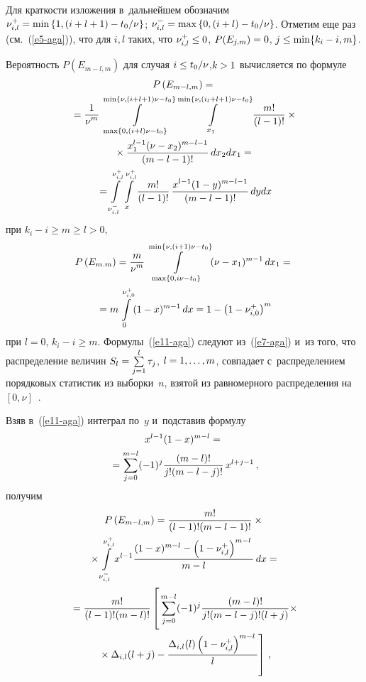 \begin{multicols}{2}
  Для краткости изложения в~дальнейшем обозначим $\nu^+_{i,l}\hm= \min
\left\{ 1, (i+l+1) - t_0/\nu\right\}$; $\nu^-_{i,l}\hm= \max \left\{ 0, (i+l)-
t_0/\nu\right\}$. Отметим еще раз (см.~(\ref{e5-aga})), что для $i,l$ таких, что
$\nu^+_{i,l}\hm\leq 0$, $P(E_{j,m})\hm=0$, $j\hm\leq \min \{k_i\hm-i,m\}$.

  Вероятность $P(E_{m-l,m})$ для случая $i\hm\leq t_0/\nu$,\linebreak $k\hm>1$
вычисляется по формуле
  \begin{multline}
  P\left( E_{m-l,m}\right) ={}\\
  {}= \displaystyle\frac{\displaystyle 1\mathstrut}{\displaystyle \nu^m\mathstrut} \int\limits_{\max\{0,(i+l)\nu-
t_0\}}^{\min\{\nu,(i+l+1)\nu-t_0\}}\int\limits_{x_1}^{\min\{\nu,(i_l+l+1)\nu-t_0\}}
 \displaystyle\frac{\displaystyle m!\mathstrut}{\displaystyle (l-1)!\mathstrut}\times{}\\
 {}\times \displaystyle\frac{\displaystyle x_1^{l-1}(\nu-x_2)^{m-l-1}\mathstrut}{\displaystyle (m-l-
1)!\mathstrut}\,dx_2dx_1={}\\
  {}=
  \int\limits_{\nu_{i,l}^-}^{\nu_{i,l}^+} \int\limits_x^{\nu_{i,l}^+} \displaystyle\frac{\displaystyle m!\mathstrut}{\displaystyle (l-
1)!\mathstrut}\,\displaystyle\frac{\displaystyle x^{l-1}(1-y)^{m-l-1}\mathstrut}{\displaystyle (m-l-1)!\mathstrut}\,dy dx
  \label{e11-aga}
  \end{multline}
при $k_i-i\geq m\geq l>0$,
\begin{multline*}
P\left( E_{m.m}\right) =\displaystyle\frac{\displaystyle m\mathstrut}{\displaystyle \nu^m\mathstrut} \int\limits^{\min\{\nu,(i+1)\nu-
t_0\}}_{\max\{0,i\nu-t_0\}} (\nu-x_1)^{m-1}\,dx_1={}\\
{}=m\int\limits_0^{\nu_{i,0}^+} (1-x)^{m-1}\,dx=1-\left(1-\nu^+_{i,0}\right)^m
\end{multline*}
при $l=0$, $k_i-i\geq m$. Формулы~(\ref{e11-aga}) следуют из~(\ref{e7-aga}) и~из того, что распределение величин $S_l\hm= \sum\limits_{j=1}^l \tau_j$, $l\hm=
1,\ldots ,m$, совпадает с~распределением порядковых статистик из
выборки~$n$, взятой из равномерного распределения на $[0,\nu]$~\cite{7-aga}.

  Взяв в~(\ref{e11-aga}) интеграл по~$y$ и~подставив формулу
  \begin{multline}
  x^{l-1}(1-x)^{m-l} ={}\\
  {}= \sum\limits_{j=0}^{m-l} (-1)^j \displaystyle\frac{\displaystyle (m-l)!\mathstrut}{\displaystyle j!(m-l-
j)!\mathstrut}\,x^{l+j-1}\,,
  \label{e12-aga}
  \end{multline}
получим
\begin{multline}
P\left( E_{m-l,m}\right) = \fr{m!}{(l-1)!(m-l-1)!}\times{}\\
{}\times \int\limits_{\nu^-
_{i,l}}^{\nu^+_{i,l}} x^{l-1}\fr{(1-x)^{m-l}-\left(1-\nu^+_{i,l}\right)^{m-l}}{m-
l}\,dx={}\\
{}=\fr{m!}{(l-1)!(m-l)!} \left[
\vphantom{\fr{\Delta_{i,l}(l)\left(1-\nu^+_{i,l}\right)^{m-l}}{l}}
\sum\limits_{j=0}^{m-l} (-1)^j \fr{(m-l)!}{j!(m-l-
j)!(l+j)}\times\right.\\
\left.{}\times\Delta_{i,l}(l+j)-
\fr{\Delta_{i,l}(l)\left(1-\nu^+_{i,l}\right)^{m-l}}{l}\right]\,,
\label{e13-aga}
\end{multline}

 \end{multicols}
  
